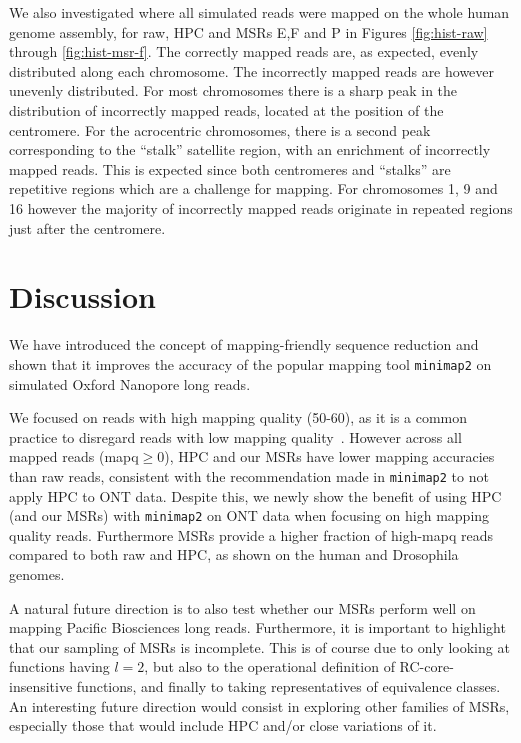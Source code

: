 \documentclass[
  11pt,
  twoside,
  BCOR=10mm,
  listof=totoc]{scrbook}
\begin{document}
We also investigated where all simulated reads were mapped on the whole human genome assembly, for raw, HPC and MSRs E,F and P in Figures \ref{fig:hist-raw} through \ref{fig:hist-msr-f}. The correctly mapped reads are, as expected, evenly distributed along each chromosome. The incorrectly mapped reads are however unevenly distributed. For most chromosomes there is a sharp peak in the distribution of incorrectly mapped reads, located at the position of the centromere. For the acrocentric chromosomes, there is a second peak corresponding to the ``stalk'' satellite region, with an enrichment of incorrectly mapped reads. This is expected since both centromeres and ``stalks'' are repetitive regions which are a challenge for mapping. For chromosomes 1, 9 and 16 however the majority of incorrectly mapped reads originate in repeated regions just after the centromere.

\hypertarget{discussion}{%
\section{Discussion}\label{discussion}}

We have introduced the concept of mapping-friendly sequence reduction and shown that it improves the accuracy of the popular mapping tool \texttt{minimap2} on simulated Oxford Nanopore long reads.

We focused on reads with high mapping quality (50-60), as it is a common practice to disregard reads with low mapping quality~\autocite{prodanovSensitiveAlignmentUsing2020,liNewStrategiesImprove2021,liSyntheticdiploidBenchmarkAccurate2018}. However across all mapped reads (mapq\(\geq 0\)), HPC and our MSRs have lower mapping accuracies than raw reads, consistent with the recommendation made in \texttt{minimap2} to not apply HPC to ONT data. Despite this, we newly show the benefit of using HPC (and our MSRs) with \texttt{minimap2} on ONT data when focusing on high mapping quality reads. Furthermore MSRs provide a higher fraction of high-mapq reads compared to both raw and HPC, as shown on the human and Drosophila genomes.

A natural future direction is to also test whether our MSRs perform well on mapping Pacific Biosciences long reads. Furthermore, it is important to highlight that our sampling of MSRs is incomplete. This is of course due to only looking at functions having \(l=2\), but also to the operational definition of RC-core-insensitive functions, and finally to taking representatives of equivalence classes. An interesting future direction would consist in exploring other families of MSRs, especially those that would include HPC and/or close variations of it.
\end{document}
